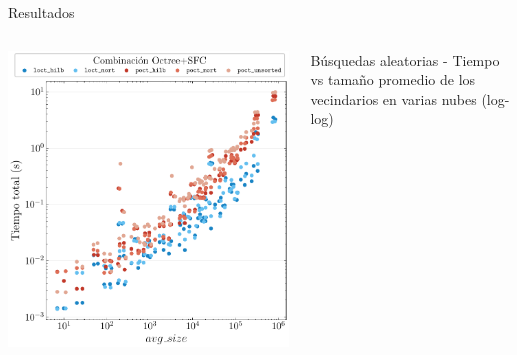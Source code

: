 \documentclass[aspectratio=169]{beamer}
\begin{document}
\begin{frame}{Resultados}
    \vspace{-1em} %
    \begin{columns}[t] %
            \includegraphics[width=0.8\linewidth]{img/loglog_subsets.pdf}
            {\scriptsize \centering Búsquedas aleatorias - Tiempo vs tamaño promedio de los vecindarios en varias nubes (log-log) \par}    \end{columns}
\end{frame}
\end{document}
